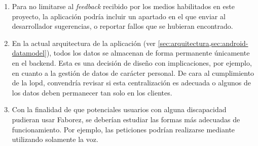 \documentclass[main]{subfiles}
\begin{document}
\begin{enumerate}
  \item Para no limitarse al \emph{feedback} recibido por los medios habilitados en este proyecto, la aplicación podría incluir un apartado en el que enviar al desarrollador sugerencias, o reportar fallos que se hubieran encontrado.
  
  \item En la actual arquitectura de la aplicación (ver \cref{sec:arquitectura,sec:android-datamodel}), todos los datos se almacenan de forma permanente únicamente en el \gls{backend}. Esta es una decisión de diseño con implicaciones, por ejemplo, en cuanto a la gestión de datos de carácter personal. De cara al cumplimiento de la \gls{lopd}, convendría revisar si esta centralización es adecuada o algunos de los datos deben permanecer tan solo en los clientes.
  
  \item Con la finalidad de que potenciales usuarios con alguna discapacidad pudieran usar Faborez, se deberían estudiar las formas más adecuadas de funcionamiento. Por ejemplo, las peticiones podrían realizarse mediante utilizando solamente la voz. 
  
\end{enumerate}
\end{document}
